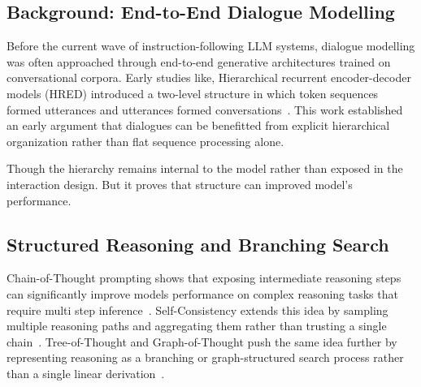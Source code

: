 \documentclass[pdflatex,sn-mathphys-num]{sn-jnl}%
\theoremstyle{thmstyleone}%
\theoremstyle{thmstyletwo}%
\theoremstyle{thmstylethree}%
\begin{document}
\subsection{Background: End-to-End Dialogue Modelling}\label{subsec:dialogue_background}

Before the current wave of instruction-following LLM systems, dialogue modelling was often approached through end-to-end generative architectures trained on conversational corpora. Early studies like, Hierarchical recurrent encoder-decoder models (HRED) introduced a two-level structure in which token sequences formed utterances and utterances formed conversations~\cite{serban2016hred}. This work  established an early argument that dialogues can be benefitted from explicit hierarchical organization rather than flat sequence processing alone.

Though the hierarchy remains internal to the model rather than exposed in the interaction design. But it proves that structure can improved model's performance.

\subsection{Structured Reasoning and Branching Search}\label{subsec:reasoning}

Chain-of-Thought prompting shows that exposing intermediate reasoning steps can significantly improve models performance on complex reasoning tasks that require multi step inference~\cite{wei2022cot}. Self-Consistency extends this idea by sampling multiple reasoning paths and aggregating them rather than trusting a single chain~\cite{wang2023selfconsistency}. Tree-of-Thought and Graph-of-Thought push the same idea further by representing reasoning as a branching or graph-structured search process rather than a single linear derivation~\cite{yao2023tot,besta2023got}.






\end{document}
